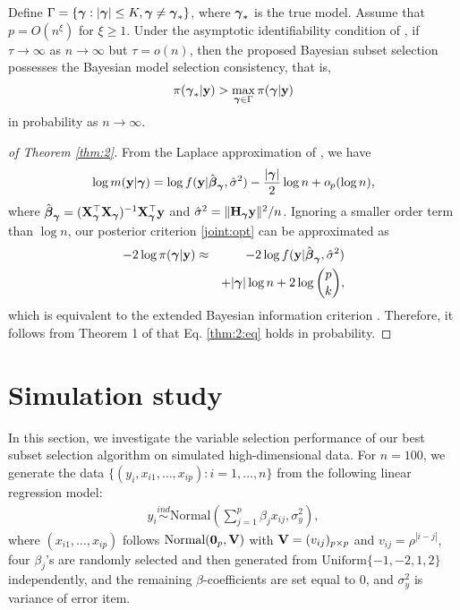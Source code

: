 \begin{theorem}\label{thm:2} Define $\Gamma=\{{\boldsymbol \gamma}:|{\boldsymbol \gamma}|\leq K,{\boldsymbol \gamma}\neq {\boldsymbol \gamma}_*\}$, where ${\boldsymbol \gamma}_*$ is the true model.  Assume that $p=O(n^\xi)$ for $\xi\geq 1$. Under the asymptotic identifiability condition of \citet{chen2008extended}, if $\tau\to \infty$ as $n\to \infty$ but $\tau=o(n)$, then the proposed Bayesian subset selection possesses the Bayesian model selection consistency, that is,
\begin{eqnarray}\label{thm:2:eq}
\pi({\boldsymbol \gamma}_*|{\bf y}) > \max_{ {\boldsymbol \gamma} \in \Gamma }\pi({\boldsymbol \gamma}|{\bf y})
\end{eqnarray}
in probability as $n\to \infty$.
\end{theorem}
\begin{proof}[of Theorem \ref{thm:2}]  From the Laplace approximation of \citet{kass1995}, we have
\begin{eqnarray*}
\log m({\bf y}|{\boldsymbol \gamma}) = \log f({\bf y}|\hat{{\boldsymbol \beta}}_{\boldsymbol \gamma}, \hat{\sigma}^2)-\frac{|{\boldsymbol \gamma}|}{2}\log n+o_p(\log n ),
\end{eqnarray*}
where  $\hat{{\boldsymbol \beta}}_{\boldsymbol \gamma}= ({\bf X}_{\boldsymbol \gamma}^{ \top} {\bf X}_{{\boldsymbol \gamma}})^{-1} {\bf X}_{{\boldsymbol \gamma}}^{ \top} {\bf y}$ and $\hat{\sigma}^2=\|{\bf H}_{{\boldsymbol \gamma}}{\bf y}\|^2/n$. Ignoring a smaller order term than $\log n$, our posterior criterion \eqref{joint:opt} can be approximated as 
\begin{eqnarray}
\nonumber -2 \log \pi({\boldsymbol \gamma} |{\bf y}) &\approx& -2 \log f({\bf y}|\hat{{\boldsymbol \beta}}_{\boldsymbol \gamma},\hat{\sigma}^2)\\
\label{ebic}&&+{|{\boldsymbol \gamma}|}\log n+2\log \binom{p}{k},
\end{eqnarray}
which is equivalent to the extended Bayesian information criterion \citep{chen2008extended}. Therefore, it follows from Theorem 1 of \citet{chen2008extended} that Eq. \eqref{thm:2:eq} holds in probability.
\end{proof}



\section{Simulation study}\label{sec:5}
In this section, we investigate the variable selection performance of our best subset selection algorithm on simulated high-dimensional data. For $n=100$, we generate the data $\{(y_i,x_{i1},\ldots,x_{ip}):i=1,\ldots,n\}$ from the following linear regression model:
\begin{eqnarray*}
y_i\overset{ind}{\sim}\text{Normal}\left(\sum_{j=1}^p \beta_j x_{ij},\sigma^2_y\right),
\end{eqnarray*}
where $(x_{i1},\ldots,x_{ip})$ follows $\text{Normal}({\boldsymbol 0}_p,{\bf V})$ with ${\bf V}=(v_{ij})_{p\times p}$ and $v_{ij}=\rho^{|i-j|}$, four $\beta_j$'s are randomly selected and then generated from $\text{Uniform}\{-1,-2,1,2\}$ independently, and the remaining $\beta$-coefficients are set equal to $0$, and $\sigma^2_y$ is variance of error item. 


